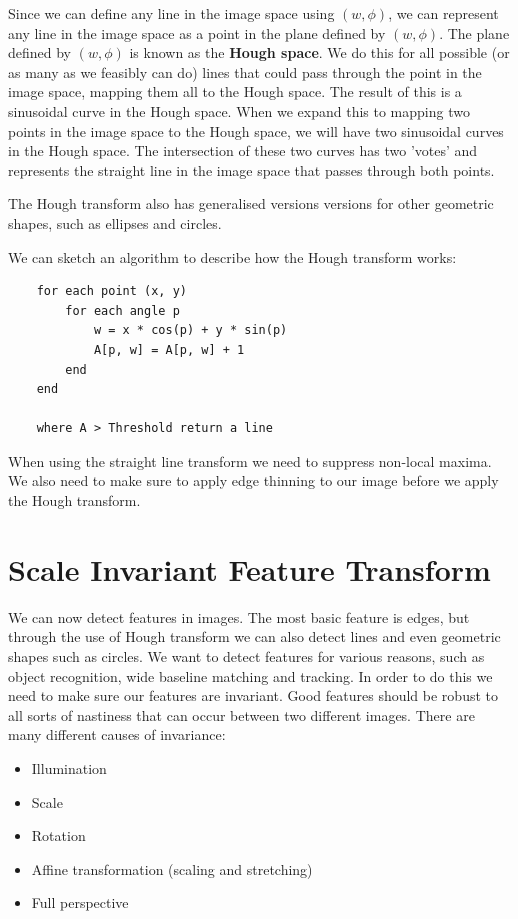 \documentclass{article}
\begin{document}
	\par 
	Since we can define any line in the image space using $(w, \phi)$, we can represent any line in the image space as a point in the plane defined by $(w, \phi)$. The plane defined by $(w, \phi)$ is known as the \textbf{Hough space}. We do this for all possible (or as many as we feasibly can do) lines that could pass through the point in the image space, mapping them all to the Hough space. The result of this is a sinusoidal curve in the Hough space. When we expand this to mapping two points in the image space to the Hough space, we will have two sinusoidal curves in the Hough space. The intersection of these two curves has two 'votes' and represents the straight line in the image space that passes through both points. 	
	
	The Hough transform also has generalised versions versions for other geometric shapes, such as ellipses and circles.
	
	\par 
	We can sketch an algorithm to describe how the Hough transform works:
	
	\begin{verbatim}
	for each point (x, y)
	    for each angle p
	        w = x * cos(p) + y * sin(p)
	        A[p, w] = A[p, w] + 1
	    end
	end
	
	where A > Threshold return a line
	\end{verbatim}
	
	When using the straight line transform we need to suppress non-local maxima. We also need to make sure to apply edge thinning to our image before we apply the Hough transform.
	
	\section{Scale Invariant Feature Transform}
	We can now detect features in images. The most basic feature is edges, but through the use of Hough transform we can also detect lines and even geometric shapes such as circles. We want to detect features for various reasons, such as object recognition, wide baseline matching and tracking. In order to do this we need to make sure our features are invariant. Good features should be robust to all sorts of nastiness that can occur between two different images. There are many different causes of invariance:
	\begin{itemize}
		\item Illumination
		\item Scale
		\item Rotation
		\item Affine transformation (scaling and stretching)
		\item Full perspective
	\end{itemize}
	
\end{document}
